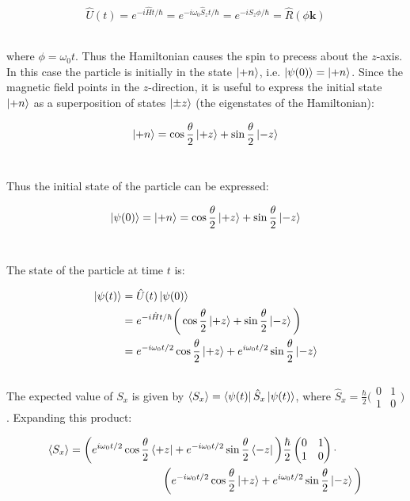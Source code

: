 \documentclass[9pt]{extarticle}
\renewcommand{\v}[1]{{\bm #1}}
\begin{document}
\begin{multicols*}{2}
$$\hat U(t) = e^{-i \hat H t / \hbar} = e^{-i \omega_0 \hat S_z t / \hbar} = e^{-i S_z \phi / \hbar} = \hat R(\phi \v k)$$ \ 

where $\phi = \omega_0 t$. Thus the Hamiltonian causes the spin to precess about the $z$-axis. \\ 

In this case the particle is initially in the state $\ket{+n}$, i.e. $\ket{\psi(0)} = \ket{+n}$. Since the magnetic field points in the $z$-direction, it is useful to express the initial state $\ket{+n}$ as a superposition of states $\ket{\pm z}$ (the eigenstates of the Hamiltonian):

$$\ket{+n} = \cos \frac \theta 2 \ket{+z} + \sin \frac \theta 2 \ket{-z}$$ \ 

Thus the initial state of the particle can be expressed: 

$$\ket{\psi(0)} = \ket{+n} = \cos \frac \theta 2 \ket{+z} + \sin \frac \theta 2 \ket{-z}$$ \

The state of the particle at time $t$ is:

$$
\begin{aligned}
	\ket{\psi(t)} &= \hat U(t) \ket{\psi(0)} \\ 
	&= e^{-i \hat H t / \hbar} \bigg( \cos \frac \theta 2 \ket{+z} + \sin \frac \theta 2 \ket{-z} \bigg)  \\ 
	&= e^{-i \omega_0 t / 2} \cos \frac \theta 2 \ket{+z} + e^{i\omega_0 t / 2} \sin \frac \theta 2 \ket{-z}
\end{aligned}
$$ \\ 

The expected value of $S_x$ is given by $\langle S_x \rangle = \bra{\psi(t)} \hat S_x \ket{\psi(t)}$, where $\hat S_x = \frac \hbar 2 \big( \begin{smallmatrix} 0 & 1 \\ 1 & 0 \end{smallmatrix} \big)$. Expanding this product:

$$
\begin{aligned}
	\langle S_x \rangle &= \bigg( e^{i\omega_0 t / 2} \cos\frac \theta 2 \bra{+z} + e^{-i \omega_0 t / 2} \sin\frac \theta 2 \bra{-z} \bigg) \frac \hbar 2 \begin{pmatrix} 0 & 1 \\ 1 & 0 \end{pmatrix}  \cdot \\ 
	&\hspace{3cm}\bigg( e^{-i \omega_0 t / 2} \cos \frac \theta 2 \ket{+z} + e^{i\omega_0 t / 2} \sin \frac \theta 2 \ket{-z} \bigg)
\end{aligned}
$$ 


\end{multicols*}
\end{document}
